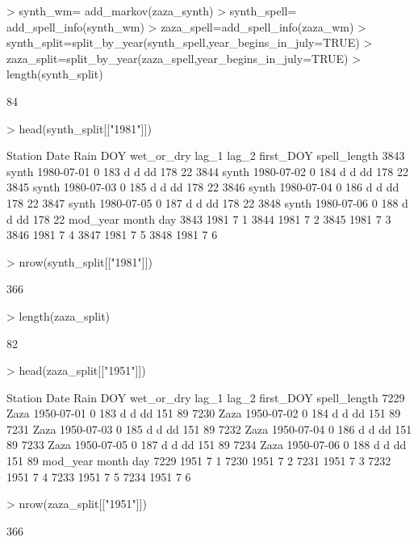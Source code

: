 \documentclass{article}
\begin{document}
\begin{Schunk}
\begin{Sinput}
> synth_wm= add_markov(zaza_synth)
> synth_spell= add_spell_info(synth_wm)
> zaza_spell=add_spell_info(zaza_wm)
> synth_split=split_by_year(synth_spell,year_begins_in_july=TRUE)
> zaza_split=split_by_year(zaza_spell,year_begins_in_july=TRUE)
> length(synth_split)
\end{Sinput}
\begin{Soutput}
[1] 84
\end{Soutput}
\begin{Sinput}
> head(synth_split[["1981"]])
\end{Sinput}
\begin{Soutput}
     Station       Date Rain DOY wet_or_dry lag_1 lag_2 first_DOY spell_length
3843   synth 1980-07-01    0 183          d     d    dd       178           22
3844   synth 1980-07-02    0 184          d     d    dd       178           22
3845   synth 1980-07-03    0 185          d     d    dd       178           22
3846   synth 1980-07-04    0 186          d     d    dd       178           22
3847   synth 1980-07-05    0 187          d     d    dd       178           22
3848   synth 1980-07-06    0 188          d     d    dd       178           22
     mod_year month day
3843     1981     7   1
3844     1981     7   2
3845     1981     7   3
3846     1981     7   4
3847     1981     7   5
3848     1981     7   6
\end{Soutput}
\begin{Sinput}
> nrow(synth_split[["1981"]])
\end{Sinput}
\begin{Soutput}
[1] 366
\end{Soutput}
\begin{Sinput}
> length(zaza_split)
\end{Sinput}
\begin{Soutput}
[1] 82
\end{Soutput}
\begin{Sinput}
> head(zaza_split[["1951"]])
\end{Sinput}
\begin{Soutput}
     Station       Date Rain DOY wet_or_dry lag_1 lag_2 first_DOY spell_length
7229    Zaza 1950-07-01    0 183          d     d    dd       151           89
7230    Zaza 1950-07-02    0 184          d     d    dd       151           89
7231    Zaza 1950-07-03    0 185          d     d    dd       151           89
7232    Zaza 1950-07-04    0 186          d     d    dd       151           89
7233    Zaza 1950-07-05    0 187          d     d    dd       151           89
7234    Zaza 1950-07-06    0 188          d     d    dd       151           89
     mod_year month day
7229     1951     7   1
7230     1951     7   2
7231     1951     7   3
7232     1951     7   4
7233     1951     7   5
7234     1951     7   6
\end{Soutput}
\begin{Sinput}
> nrow(zaza_split[["1951"]])
\end{Sinput}
\begin{Soutput}
[1] 366
\end{Soutput}
\end{Schunk}
\end{document}
